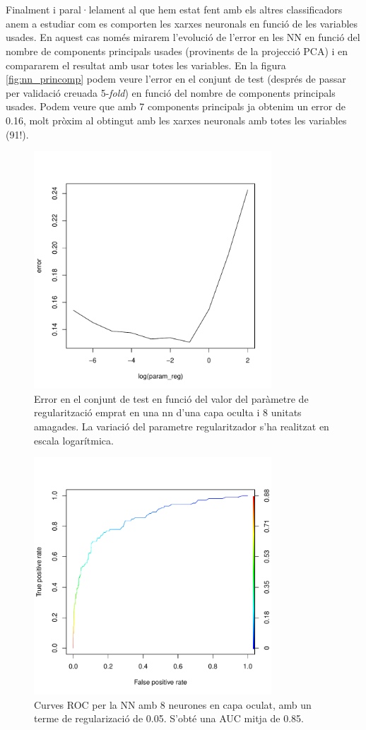 \documentclass[a4paper,10pt]{article}
\begin{document}
\\
\\
Finalment i paral·lelament al que hem estat fent amb els altres classificadors anem a estudiar com es comporten les xarxes neuronals en funció de les variables usades. En aquest cas només mirarem l'evolució de l'error en les NN en funció del nombre de components principals usades (provinents de la projecció PCA) i en compararem el resultat amb usar totes les variables. En la figura \ref{fig:nn_princomp} podem veure l'error en el conjunt de test (després de passar per validació creuada 5-\textit{fold}) en funció del nombre de components principals usades. Podem veure que amb 7 components principals ja obtenim un error de 0.16, molt pròxim al obtingut amb les xarxes neuronals amb totes les variables (91!).



\begin{figure}
\centering
\includegraphics[width=3.5in]{memoria-nn_regular}
\caption{Error en el conjunt de test en funció del valor del paràmetre de regularització emprat en una nn d'una capa oculta i 8 unitats amagades. La variació del parametre regularitzador s'ha realitzat en escala logarítmica.} \label{fig:nn_regular}
\end{figure}


\begin{figure}
\centering
\includegraphics[width=3.5in]{memoria-nn_roc}
\caption{Curves ROC per la NN amb 8 neurones en capa oculat, amb un terme de regularizació de 0.05. S'obté una AUC mitja de 0.85.} \label{fig:nn_roc}
\end{figure}
\end{document}
